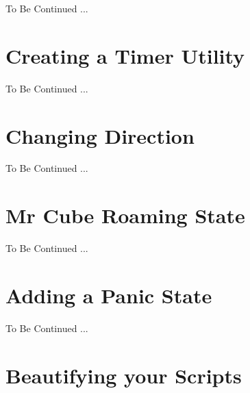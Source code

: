 \begin{tipbox}


{\Large \color{black} To Be Continued ... }

\end{tipbox}


\chapter{Creating a Timer Utility}
\label{creatingatimerutility}

\begin{tipbox}


{\Large \color{black} To Be Continued ... }

\end{tipbox}


\chapter{Changing Direction}
\label{changingdirection}

\begin{tipbox}


{\Large \color{black} To Be Continued ... }

\end{tipbox}


\chapter{Mr Cube Roaming State}
\label{mrcuberoamingstate}

\begin{tipbox}


{\Large \color{black} To Be Continued ... }

\end{tipbox}


\chapter{Adding a Panic State}
\label{addingapanicstate}

\begin{tipbox}


{\Large \color{black} To Be Continued ... }

\end{tipbox}


\chapter{Beautifying your Scripts}
\label{beautifyingyourscripts}

